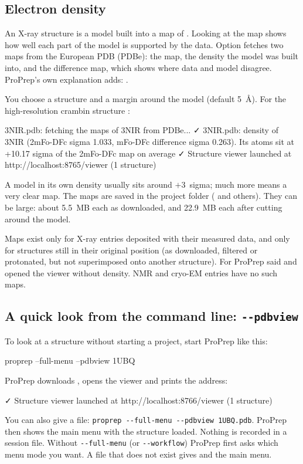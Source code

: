 \subsection{Electron density}

An X-ray structure is a model built into a map of .
Looking at the map shows how well each part of the model is supported by the
data. Option  fetches two maps from the European PDB (PDBe): the
 map, the density the model was built into, and the
 difference map, which shows where data and model disagree.
ProPrep's own explanation adds: .

You choose a structure and a margin around the model (default 5~Å). For the
high-resolution crambin structure :
\begin{screen}
3NIR.pdb: fetching the maps of 3NIR from PDBe...
✓ 3NIR.pdb: density of 3NIR (2mFo-DFc sigma 1.033, mFo-DFc difference sigma
0.263). Its atoms sit at +10.17 sigma of the 2mFo-DFc map on average
✓ Structure viewer launched at http://localhost:8765/viewer (1 structure)
\end{screen}
A model in its own density usually sits around $+3$~sigma; much more means a
very clear map. The maps are saved in the project folder (
and others). They can be large: about 5.5~MB each as downloaded, and 22.9~MB
each after cutting around the model.

Maps exist only for X-ray entries deposited with their measured data, and only
for structures still in their original position (as downloaded, filtered or
protonated, but not superimposed onto another structure). For 
ProPrep said  and opened the viewer without
density. NMR and cryo-EM entries have no such maps.

\subsection{A quick look from the command line: \texttt{-{}-pdbview}}

To look at a structure without starting a project, start ProPrep like this:
\begin{terminal}
proprep --full-menu --pdbview 1UBQ
\end{terminal}
ProPrep downloads , opens the viewer and prints the address:
\begin{screen}
✓ Structure viewer launched at http://localhost:8766/viewer (1 structure)
\end{screen}
You can also give a file: \texttt{proprep -{}-full-menu -{}-pdbview 1UBQ.pdb}.
ProPrep then shows the main menu with the structure loaded. Nothing is
recorded in a session file. Without \texttt{-{}-full-menu} (or
\texttt{-{}-workflow}) ProPrep first asks which menu mode you want. A file that
does not exist gives  and the main menu.

